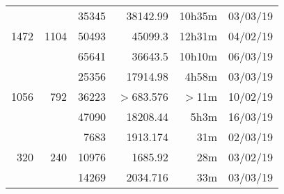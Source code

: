 \begin{center}
\begin{tabular}{ r r r | r r r }
  \hline
  \multirow{3}{*}{1472} & \multirow{3}{*}{1104} & 35345 & 38142.99 & 10h35m & 03/03/19 \\
  & & 50493 & 45099.3 & 12h31m & 04/02/19 \\
  & & 65641 & 36643.5 & 10h10m & 06/03/19 \\
  \hline
  \multirow{3}{*}{1056} & \multirow{3}{*}{792} & 25356 & 17914.98 & 4h58m & 03/03/19 \\
  & & 36223 & $>$683.576 & $>$11m & 10/02/19 \\
  & & 47090 & 18208.44 & 5h3m & 16/03/19 \\
  \hline
  \multirow{3}{*}{320} & \multirow{3}{*}{240} & 7683 & 1913.174 & 31m & 02/03/19 \\
  & & 10976 & 1685.92 & 28m & 03/02/19 \\
  & & 14269 & 2034.716 & 33m & 03/03/19 \\
  \end{tabular}
  \end{center}

\newpage
